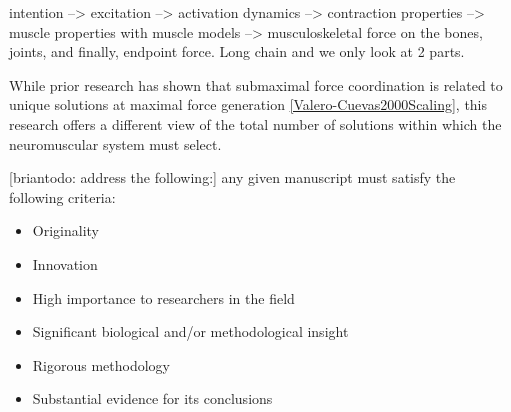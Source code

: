 intention --> excitation --> activation dynamics --> contraction properties --> muscle properties with muscle models --> musculoskeletal force on the bones, joints, and finally, endpoint force. Long chain and we only look at 2 parts.

While prior research has shown that submaximal force coordination is related to unique solutions at maximal force generation \ref{Valero-Cuevas2000Scaling}, this research offers a different view of the total number of solutions within which the neuromuscular system must select.


[briantodo: address the following:]
any given manuscript must satisfy the following criteria:
\begin{itemize}
	\item {Originality}
	\item {Innovation}
	\item {High importance to researchers in the field}
	\item {Significant biological and/or methodological insight}
	\item {Rigorous methodology}
	\item {Substantial evidence for its conclusions}
\end{itemize}


